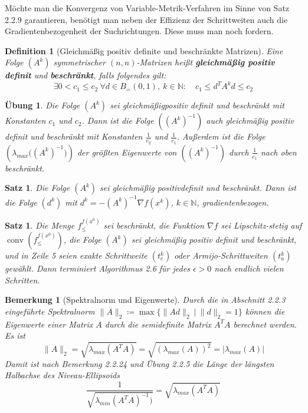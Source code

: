 \documentclass[11pt]{scrreprt}
\newcounter{thm}
\theoremstyle{thmstyle}
\numberwithin{thm}{section}
\newtheorem{bemerkung}[thm]{Bemerkung}
\newtheorem{definition}[thm]{Definition}
\newtheorem{satz}[thm]{Satz}
\newtheorem{uebung}[thm]{Übung}
\begin{document}
Möchte man die Konvergenz von Variable-Metrik-Verfahren im Sinne von Satz 2.2.9 garantieren, benötigt man neben der Effizienz der Schrittweiten auch die Gradientenbezogenheit der Suchrichtungen. Diese muss man noch fordern.

\begin{definition}[Gleichmäßig positiv definite und beschränkte Matrizen]
	Eine Folge $(A^k)$ symmetrischer $(n,n)$-Matrizen heißt \textbf{gleichmäßig positiv definit} und \textbf{beschränkt}, falls folgendes gilt:
	$$ \exists 0 < c_1 \leq c_2 ~\forall d \in B_{=}(0, 1), ~k \in \mathbb{N}: \quad c_1 \leq d^T A^k d \leq c_2 $$
\end{definition}

\begin{uebung}
	Die Folge $(A^k)$ sei gleichmäßigpositiv definit und beschränkt mit Konstanten $c_1$ und $c_2$. Dann ist die Folge $\left( (A^k)^{-1} \right)$ auch gleichmäßig positiv definit und beschränkt mit Konstanten $\frac{1}{c_2}$ und $\frac{1}{c_1}$. Außerdem ist die Folge $\left( \lambda_{max} \big( (A^k)^{-1} \big) \right)$ der größten Eigenwerte von $\left( (A^k)^{-1} \right)$ durch $\frac{1}{c_1}$ nach oben beschränkt.
\end{uebung}

\begin{satz}
	Die Folge $(A^k)$ sei gleichmäßig positivdefinit und beschränkt. Dann ist die Folge $(d^k)$ mit $d^k = - \left( A^k \right)^{-1} \nabla f(x^k)$, $k \in \mathbb{N}$, gradientenbezogen.
\end{satz}

\begin{satz}
	Die Menge $f_{\leq}^{f(x^0)}$ sei beschränkt, die Funktion $\nabla f$ sei Lipschitz-stetig auf $\operatorname{conv}(f_{\leq}^{f(x^0)})$, die Folge $(A^k)$ sei gleichmäßig positiv definit und beschränkt, und in Zeile 5 seien exakte Schrittweite $(t_e^k)$ oder Armijo-Schrittweiten $(t_a^k)$ gewählt. Dann terminiert Algorithmus 2.6 für jedes $\epsilon > 0$ nach endlich vielen Schritten.
\end{satz}

\begin{bemerkung}[Spektralnorm und Eigenwerte]
		Durch die in Abschnitt 2.2.3 eingeführte Spektralnorm $\|A \|_2 \coloneqq \max \big\{ \| Ad \|_2 ~|~\|d\|_2 = 1 \big\}$ können die Eigenwerte einer Matrix $A$ durch die semidefinite Matrix $A^T A$ berechnet werden. Es ist
		$$ \| A \|_2 = \sqrt{ \lambda_{max}(A^TA)} = \sqrt{ \left( \lambda_{max}(A) \right)^2} = |\lambda_{max}(A) | $$
		Damit ist nach Bemerkung 2.2.24 und Übung 2.2.5 die Länge der längsten Halbachse des Niveau-Ellipsoids
		$$ \frac{1}{\sqrt{\lambda_{min}(A^TA)^{-1})}} = \sqrt{ \lambda_{max}(A^TA)} $$
\end{bemerkung}
\end{document}
